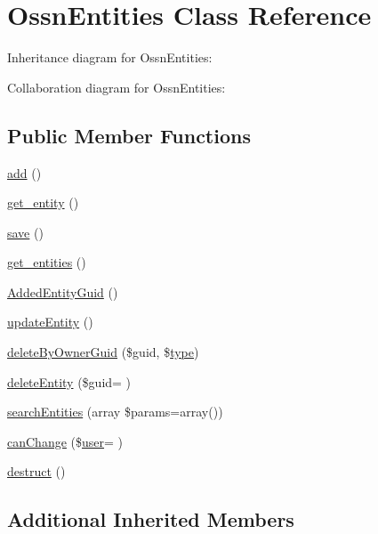\hypertarget{class_ossn_entities}{}\section{Ossn\+Entities Class Reference}
\label{class_ossn_entities}


Inheritance diagram for Ossn\+Entities\+:


Collaboration diagram for Ossn\+Entities\+:
\subsection*{Public Member Functions}
\begin{DoxyCompactItemize}
\item 
\hyperlink{class_ossn_entities_a837ba24a1c3095ae67613238d866f79a}{add} ()
\item 
\hyperlink{class_ossn_entities_a321877fa6f77cfda6c6763efe3da10e6}{get\+\_\+entity} ()
\item 
\hyperlink{class_ossn_entities_afc8a3c62679cf00ade9f15fb2a6d6132}{save} ()
\item 
\hyperlink{class_ossn_entities_af580e98d90eb524e74b3d21db5a3a09b}{get\+\_\+entities} ()
\item 
\hyperlink{class_ossn_entities_a21f27b72410c2bbfadf8273f0d67168e}{Added\+Entity\+Guid} ()
\item 
\hyperlink{class_ossn_entities_abe5ac96a7b95dd2f9f579d7477de3119}{update\+Entity} ()
\item 
\hyperlink{class_ossn_entities_a4fe96bc82545e1a91c1d87d02736e9c0}{delete\+By\+Owner\+Guid} (\$guid, \$\hyperlink{_ossn_wall_2actions_2wall_2post_2group_8php_a2dc1bb4e1ed0029daa81ac0776b14b51}{type})
\item 
\hyperlink{class_ossn_entities_af1ff761ae28dc1baaf861309f8daa812}{delete\+Entity} (\$guid= \textquotesingle{}\textquotesingle{})
\item 
\hyperlink{class_ossn_entities_a76dd33e48f570ebff21d3a421ce5cbc9}{search\+Entities} (array \$params=array())
\item 
\hyperlink{class_ossn_entities_a05804a6fe9cab2e6bb201030fabfa357}{can\+Change} (\$\hyperlink{ossn_8config_8db_8example_8php_a802544b7ba9f79bbf24ef67773d53bed}{user}= \textquotesingle{}\textquotesingle{})
\item 
\hyperlink{class_ossn_entities_a1e268d11410f6c59c0f8a0c7b6892c00}{destruct} ()
\end{DoxyCompactItemize}
\subsection*{Additional Inherited Members}


